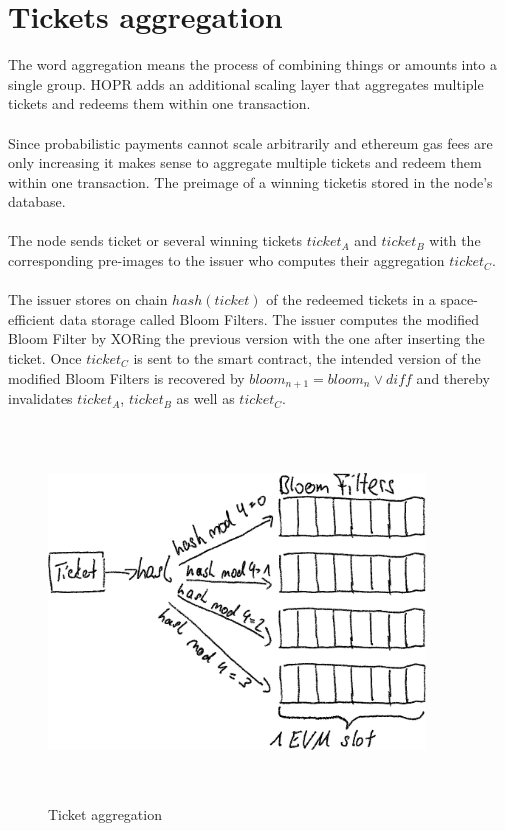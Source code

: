 \section{Tickets aggregation}
The word aggregation means the process of combining things or amounts into a single group. 
HOPR adds an additional scaling layer that aggregates multiple tickets and redeems them within one transaction.
\\~\\ Since probabilistic payments cannot scale arbitrarily and ethereum gas fees are only increasing it makes sense to aggregate multiple tickets and redeem them within one transaction.
The preimage of a winning ticketis stored in the node’s database. 
\\~\\ The node sends ticket or several winning tickets $ticket_A$ and $ticket_B$ with the corresponding pre-images to the issuer who computes their aggregation $ticket_C$. 
\\~\\The issuer stores on chain $hash(ticket)$ of the redeemed tickets in a space-efficient data storage called Bloom Filters.
The issuer computes the modified Bloom Filter by XORing the previous version with the one after inserting the ticket.
\newline Once $ticket_C$ is sent to the smart contract, the intended version of the modified Bloom Filters is recovered by $bloom_{n+1} = bloom_n \vee diff$ and thereby invalidates $ticket_A$, $ticket_B$ as well as $ticket_C$.

\begin{figure}[H]
    \centering
    \includegraphics[width=10cm,height=10cm,keepaspectratio]{../whitepaper/images/ticket_aggregation.png}
    \caption{Ticket aggregation}
    \label{fig:Ticket aggregation}
    \end{figure}
